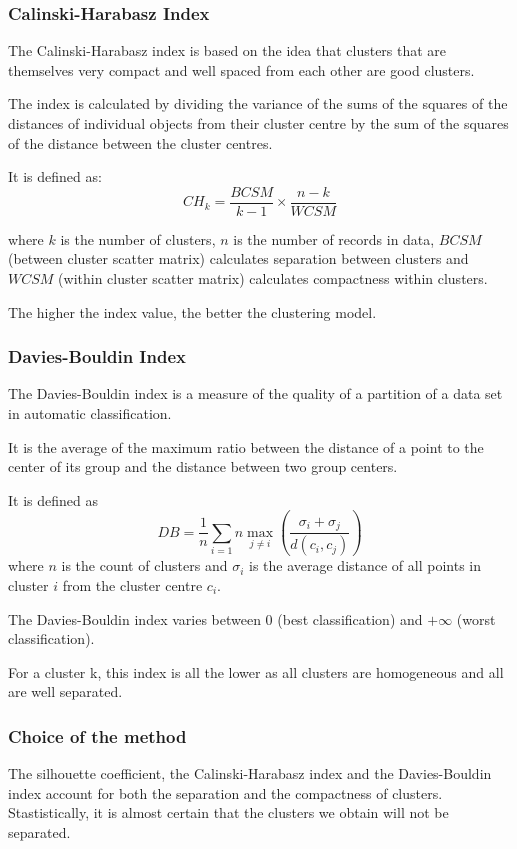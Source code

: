 \documentclass[12pt,a4paper,openany,UKenglish]{scrreprt}
\begin{document}
\subsubsection{Calinski-Harabasz Index}
The Calinski-Harabasz index is based on the idea that clusters that are themselves very compact and well spaced from each other are good clusters.

The index is calculated by dividing the variance of the sums of the squares of the distances of individual objects from their cluster centre by the sum of the squares of the distance between the cluster centres.

It is defined as:
$$
	CH_k = \frac{BCSM}{k-1}\times\frac{n-k}{WCSM}
$$

where $k$ is the number of clusters, $n$ is the number of records in data, $BCSM$ (between cluster scatter matrix) calculates separation between clusters and $WCSM$ (within cluster scatter matrix) calculates compactness within clusters.

The higher the index value, the better the clustering model.

\subsubsection{Davies-Bouldin Index}
The Davies-Bouldin index is a measure of the quality of a partition of a data set in automatic classification.

It is the average of the maximum ratio between the distance of a point to the center of its group and the distance between two group centers.

It is defined as
$$
	DB = \frac1n\sum_{i=1}n\max_{j\neq i}\left(\frac{\sigma_i+\sigma_j}{d(c_i, c_j)}\right)
$$
where $n$ is the count of clusters and $\sigma_i$ is the average distance of all points in cluster $i$ from the cluster centre $c_i$.

The Davies-Bouldin index varies between 0 (best classification) and $\textstyle +\infty$ (worst classification).

For a cluster k, this index is all the lower as all clusters are homogeneous and all are well separated.

\subsubsection{Choice of the method}
The silhouette coefficient, the Calinski-Harabasz index and the Davies-Bouldin index account for both the separation and the compactness of clusters. Stastistically, it is almost certain that the clusters we obtain will not be separated.
\end{document}
